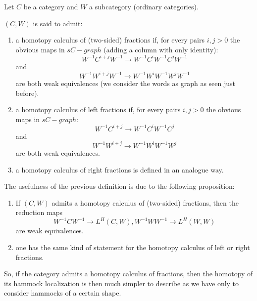 \begin{refsection}
Let $C$ be a category and $W$ a subcategory (ordinary categories).

\begin{defin}
$(C,W)$ is said to admit:
\begin{enumerate}
\item a homotopy calculus of (two-sided) fractions if, for every pairs $i,j >0$ the obvious maps in $sC-graph$ (adding a column with only identity):
\begin{equation}
W^{-1}C^{i+j}W^{-1} \rightarrow W^{-1}C^iW^{-1}C^jW^{-1}
\end{equation}
and
\begin{equation}
W^{-1}W^{i+j}W^{-1} \rightarrow W^{-1}W^i W^{-1} W^j W^{-1}
\end{equation}
are both weak equivalences (we consider the words as graph as seen just before).
\item a homotopy calculus of left fractions if, for every pairs $i,j >0$ the obvious maps in $sC-graph$:
\begin{equation}
W^{-1}C^{i+j} \rightarrow W^{-1}C^iW^{-1}C^j
\end{equation}
and
\begin{equation}
W^{-1}W^{i+j} \rightarrow W^{-1}W^i W^{-1} W^j
\end{equation}
are both weak equivalences.
\item a homotopy calculus of right fractions is defined in an analogue way.
\end{enumerate}
\end{defin}

The usefulness of the previous definition is due to the following proposition:

\begin{prop}
\begin{enumerate}
\item If $(C,W)$ admits a homotopy calculus of (two-sided) fractions, then the reduction maps
\begin{equation}
W^{-1}CW^{-1} \rightarrow L^H (C,W), W^{-1}WW^{-1} \rightarrow L^H (W,W)
\end{equation}
are weak equivalences.
\item one has the same kind of statement for the homotopy calculus of left or right fractions.
\end{enumerate}
\end{prop}

So, if the category admits a homotopy calculus of fractions, then the homotopy of its hammock localization is then much simpler to describe as we have only to consider hammocks of a certain shape.


\end{refsection}
